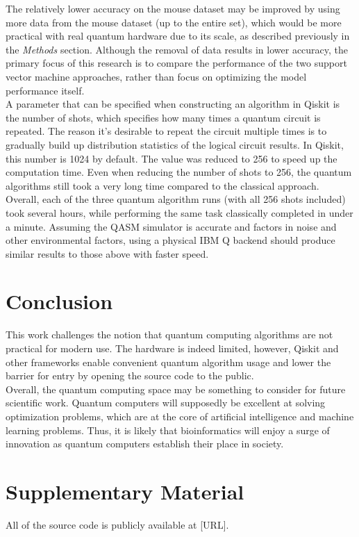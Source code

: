 \documentclass{article}
\begin{document}
    The relatively lower accuracy on the mouse dataset may be improved by using more data from the mouse dataset (up to the entire set), which would be more practical with real quantum hardware due to its scale, as described previously in the \textit{Methods} section. Although the removal of data results in lower accuracy, the primary focus of this research is to compare the performance of the two support vector machine approaches, rather than focus on optimizing the model performance itself. \\

    A parameter that can be specified when constructing an algorithm in Qiskit is the number of shots, which specifies how many times a quantum circuit is repeated. The reason it's desirable to repeat the circuit multiple times is to gradually build up distribution statistics of the logical circuit results. In Qiskit, this number is 1024 by default. The value was reduced to 256 to speed up the computation time. Even when reducing the number of shots to 256, the quantum algorithms still took a very long time compared to the classical approach. Overall, each of the three quantum algorithm runs (with all 256 shots included) took several hours, while performing the same task classically completed in under a minute. Assuming the QASM simulator is accurate and factors in noise and other environmental factors, using a physical IBM Q backend should produce similar results to those above with faster speed.

\section{Conclusion}
  This work challenges the notion that quantum computing algorithms are not practical for modern use. The hardware is indeed limited, however, Qiskit and other frameworks enable convenient quantum algorithm usage and lower the barrier for entry by opening the source code to the public. \\

  Overall, the quantum computing space may be something to consider for future scientific work. Quantum computers will supposedly be excellent at solving optimization problems, which are at the core of artificial intelligence and machine learning problems. Thus, it is likely that bioinformatics will enjoy a surge of innovation as quantum computers establish their place in society.

\section{Supplementary Material}
All of the source code is publicly available at [URL].

\newpage

\raggedright

\end{document}
